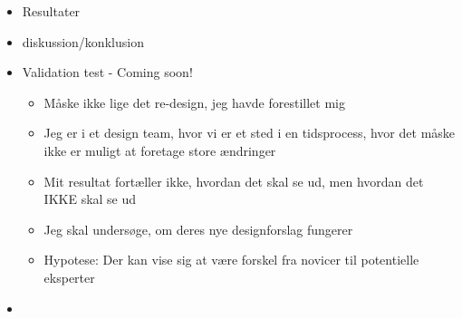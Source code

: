 \begin{itemize}
	
	\item Resultater
	\item diskussion/konklusion
	\item Validation test - Coming soon!
	\begin{itemize}
		\item Måske ikke lige det re-design, jeg havde forestillet mig
		\item Jeg er i et design team, hvor vi er et sted i en tidsprocess, hvor det måske ikke er muligt at foretage store ændringer
		\item Mit resultat fortæller ikke, hvordan det skal se ud, men hvordan det IKKE skal se ud
		\item Jeg skal undersøge, om deres nye designforslag fungerer
		\item Hypotese: Der kan vise sig at være forskel fra novicer til potentielle eksperter
	\end{itemize}
\end{itemize}

\begin{itemize}
	\item 
\end{itemize}














